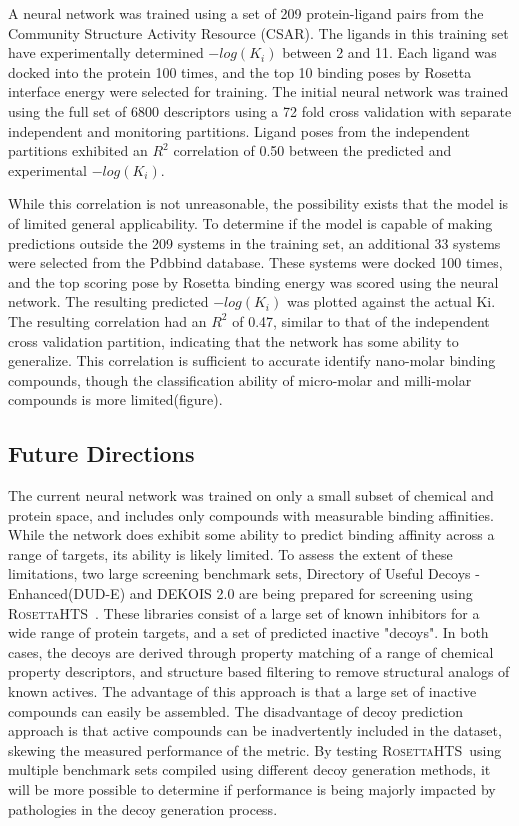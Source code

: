 \documentclass[11pt, oneside]{article}   	%
\newcommand{\rhts}{\textsc{RosettaHTS}\ }
\begin{document}
A neural network was trained using a set of 209 protein-ligand pairs from the Community Structure Activity Resource (CSAR)\citep{Smith:2011gb}.  
The ligands in this training set have experimentally determined $-log(K_{i})$ between 2 and 11.  
Each ligand was docked into the protein 100 times, and the top 10 binding poses by Rosetta interface energy were selected for training. 
The initial neural network was trained using the full set of 6800 descriptors using a 72 fold cross validation with separate independent and monitoring partitions.  
Ligand poses from the independent partitions exhibited an $R^{2}$ correlation of 0.50 between the predicted and experimental $-log(K_{i})$.

While this correlation is not unreasonable, the possibility exists that the model is of limited general applicability.  
To determine if the model is capable of making predictions outside the 209 systems in the training set, an additional 33 systems were selected from the Pdbbind database.  
These systems were docked 100 times, and the top scoring pose by Rosetta binding energy was scored using the neural network.
The resulting predicted $-log(K_{i})$ was plotted against the actual Ki.
The resulting correlation had an $R^{2}$ of 0.47, similar to that of the independent cross validation partition, indicating that the network has some ability to generalize.
This correlation is sufficient to accurate identify nano-molar binding compounds, though the classification ability of micro-molar and milli-molar compounds is more limited(figure).

\subsection{Future Directions}
The current neural network was trained on only a small subset of chemical and protein space, and includes only compounds with measurable binding affinities.  
While the network does exhibit some ability to predict binding affinity across a range of targets, its ability is likely limited. 
To assess the extent of these limitations, two large screening benchmark sets, Directory of Useful Decoys - Enhanced(DUD-E)\citep{Mysinger:2012hu} and DEKOIS 2.0\citep{Bauer:2013de} are being prepared for screening using \rhts.
These libraries consist of a large set of known inhibitors for a wide range of protein targets, and a set of predicted inactive "decoys".  
In both cases, the decoys are derived through property matching of a range of chemical property descriptors, and structure based filtering to remove structural analogs of known actives.   
The advantage of this approach is that a large set of inactive compounds can easily be assembled.
The disadvantage of decoy prediction approach is that active compounds can be inadvertently included in the dataset, skewing the measured performance of the metric.
By testing \rhts using multiple benchmark sets compiled using different decoy generation methods, it will be more possible to determine if performance is being majorly impacted by pathologies in the decoy generation process. 
\end{document}
